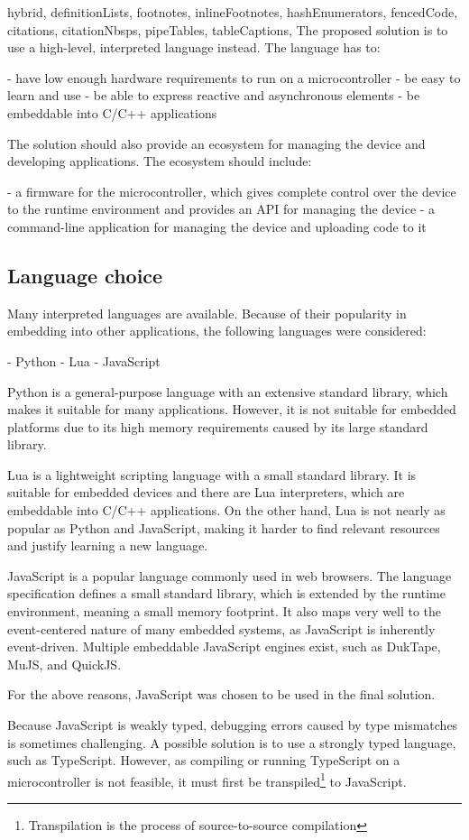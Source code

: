 \begin{markdown*}{%
  hybrid,
  definitionLists,
  footnotes,
  inlineFootnotes,
  hashEnumerators,
  fencedCode,
  citations,
  citationNbsps,
  pipeTables,
  tableCaptions,
}
The proposed solution is to use a high-level, interpreted language instead. The language has to:

  - have low enough hardware requirements to run on a microcontroller
  - be easy to learn and use
  - be able to express reactive and asynchronous elements
  - be embeddable into C/C++ applications

The solution should also provide an ecosystem for managing the device and developing applications. The ecosystem should include:

  - a firmware for the microcontroller, which gives complete control over the device to the runtime environment and provides an API for managing the device
  - a command-line application for managing the device and uploading code to it

\subsection{Language choice}

Many interpreted languages are available. Because of their popularity in embedding into other applications, the following languages were considered:

  - Python
  - Lua
  - JavaScript

Python is a general-purpose language with an extensive standard library, which makes it suitable for many applications. However, it is not suitable for embedded platforms due to its high memory requirements caused by its large standard library.

Lua is a lightweight scripting language with a small standard library. It is suitable for embedded devices and there are Lua interpreters, which are embeddable into C/C++ applications. On the other hand, Lua is not nearly as popular as Python and JavaScript, making it harder to find relevant resources and justify learning a new language.

JavaScript is a popular language commonly used in web browsers. The language specification defines a small standard library, which is extended by the runtime environment, meaning a small memory footprint. It also maps very well to the event-centered nature of many embedded systems, as JavaScript is inherently event-driven. Multiple embeddable JavaScript engines exist, such as DukTape, MuJS, and QuickJS.

For the above reasons, JavaScript was chosen to be used in the final solution.

Because JavaScript is weakly typed, debugging errors caused by type mismatches is sometimes challenging. A possible solution is to use a strongly typed language, such as TypeScript. However, as compiling or running TypeScript on a microcontroller is not feasible, it must first be transpiled\footnote{Transpilation is the process of source-to-source compilation} to JavaScript.



\end{markdown*}
